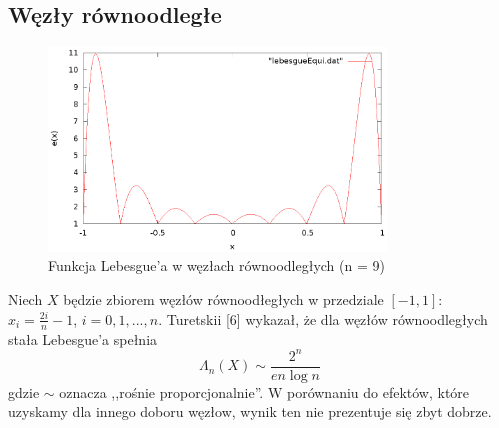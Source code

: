 \documentclass{article}
\begin{document}
\subsection{Węzły równoodległe}
\begin{figure}[H]
	\centering
    \includegraphics[width=0.8\textwidth]{wykresy/lebesgueEqui.eps}
    \caption{Funkcja Lebesgue'a w węzłach równoodległych (n = 9)}
\end{figure}
Niech $X$ będzie zbiorem węzłów równoodłegłych w przedziale $[-1, 1]$: $x_i = \frac{2i}{n} - 1$, $i = 0, 1, ..., n$. Turetskii [6] wykazał, że dla węzłów równoodległych stała Lebesgue'a spełnia
\begin{equation*}
\Lambda_n(X) \sim \frac{2^n}{en\log n}
\end{equation*}
gdzie $\sim$ oznacza ,,rośnie proporcjonalnie''. W porównaniu do efektów, które uzyskamy dla innego doboru węzłow, wynik ten nie prezentuje się zbyt dobrze.
\end{document}
